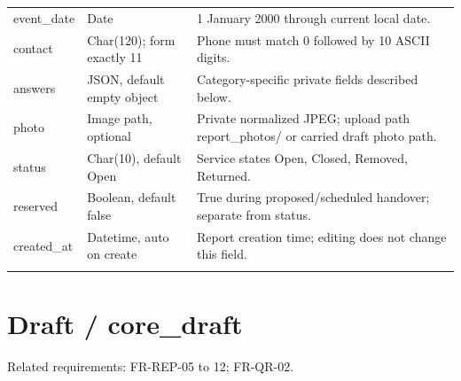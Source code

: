 \documentclass[12pt,a4paper,oneside]{report}
\begin{document}
\begin{longtable}{@{}P{0.24\dimexpr\textwidth-24pt\relax}P{0.28\dimexpr\textwidth-24pt\relax}P{0.48\dimexpr\textwidth-24pt\relax}@{}}
event\_date & Date & 1 January 2000 through current local date. \\ \addlinespace[3pt]

contact & Char(120); form exactly 11 & Phone must match 0 followed by 10 ASCII digits. \\ \addlinespace[3pt]

answers & JSON, default empty object & Category-specific private fields described below. \\ \addlinespace[3pt]

photo & Image path, optional & Private normalized JPEG; upload path report\_photos/ or carried draft photo path. \\ \addlinespace[3pt]

status & Char(10), default Open & Service states Open, Closed, Removed, Returned. \\ \addlinespace[3pt]

reserved & Boolean, default false & True during proposed/scheduled handover; separate from status. \\ \addlinespace[3pt]

created\_at & Datetime, auto on create & Report creation time; editing does not change this field. \\ \addlinespace[3pt]

\end{longtable}


\section{Draft / core\_draft}

Related requirements: FR-REP-05 to 12; FR-QR-02.
\end{document}
